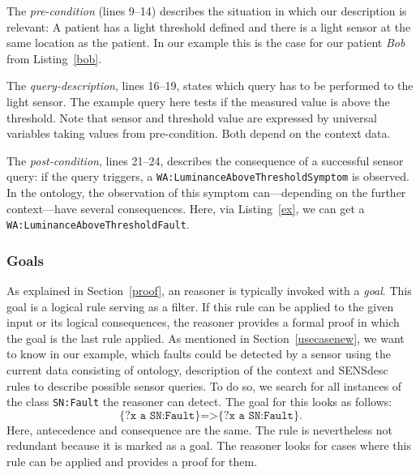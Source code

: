 The \emph{pre-condition} (lines 9--14) describes the situation in which our description is relevant: 
A patient has a light threshold defined %
and there is a light sensor at the same location as the patient. In our example this is the case for our patient \emph{Bob} from Listing~\ref{bob}.

The \emph{query-description}, lines 16--19, states which query has to be performed to the light sensor. The example query here tests if the measured value 
is above the threshold.
Note that sensor and threshold value
are expressed by universal variables taking values from pre-condition. Both depend on the context data.

The \emph{post-condition}, lines 21--24, describes the consequence of a successful sensor query: if the query triggers, a  
\texttt{WA:LuminanceAboveThresholdSymptom} is observed.
In the ontology, the observation of this symptom can---depending on the further context---have several consequences. 
Here, via Listing~\ref{ex}, we can get a \texttt{WA:LuminanceAboveThresholdFault}.

\subsubsection{Goals}
As explained in Section~\ref{proof}, an \nthree reasoner is typically invoked with a \emph{goal}. This goal is a logical rule serving as a filter.
If this rule can be applied to the given input or its logical consequences, the reasoner provides a formal proof 
 in which the goal is the last rule
applied.
As mentioned in Section~\ref{usecasenew}, we want to know in our example, which 
faults could be detected by a sensor using the current data consisting of ontology, description of the context and SENSdesc rules to describe possible sensor queries. 
To do so, we search for all instances of the class \texttt{SN:Fault} the reasoner can detect. 
The goal for this looks as follows:
\begin{equation}\label{goal}
 \texttt{\{?x a SN:Fault\}=>\{?x a SN:Fault\}.}
\end{equation}
Here, antecedence and consequence are the same. 
The rule is nevertheless not redundant because it is marked
as a goal. The reasoner looks for cases where this rule can be applied and provides a proof for them.

